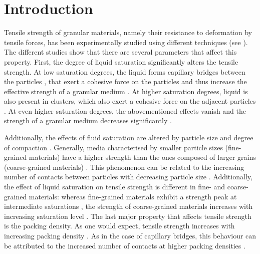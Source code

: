 \section{Introduction}
\label{intro}

Tensile strength of granular materials, namely their resistance to deformation by tensile forces, has been experimentally studied using different techniques (see \cite{Kristensen1985,Lu2007,Pierrat1998,Pierrat1997,Schubert1975,Takenaka1981,Turba1964}). The different studies show that there are several parameters that affect this property. First, the degree of liquid saturation significantly alters the tensile strength. At low saturation degrees, the liquid forms capillary bridges between the particles \cite{Iveson2001,Scheel2008NM}, that exert a cohesive force on the particles and thus increase the effective strength of a granular medium \cite{Fisher1926,Haines1925,Herminghaus2005,Hornbaker1997,Lu2007,Mitarai2006,Scheel2008JP,Schiffer2005}. At higher saturation degrees, liquid is also present in clusters, which also exert a cohesive force on the adjacent particles \cite{Iveson2001,Scheel2008NM}. At even higher saturation degrees, the abovementioned effects vanish and the strength of a granular medium decreases significantly \cite{Lu2007,Mitarai2006}.

Additionally, the effects of fluid saturation are altered by particle size and degree of compaction \cite{Iveson2001,Kim2003}. Generally, media characterised by smaller particle sizes (fine-grained materials) have a higher strength than the ones composed of larger grains (coarse-grained materials) \cite{Lu2007}. This phenomenon can be related to the increasing number of contacts between particles with decreasing particle size \cite{Carr1967}. Additionally, the effect of liquid saturation on tensile strength is different in fine- and coarse-grained materials: whereas fine-grained materials exhibit a strength peak at intermediate saturations \cite{Lu2007,Takenaka1981}, the strength of coarse-grained materials increases with increasing saturation level \cite{Lu2007,Schubert1975}. The last major property that affects tensile strength is the packing density. As one would expect, tensile strength increases with increasing packing density \cite{Kim2003,Rumpf1962}. As in the case of capillary bridges, this behaviour can be attributed to the increased number of contacts at higher packing densities \cite{Kim2003}.

